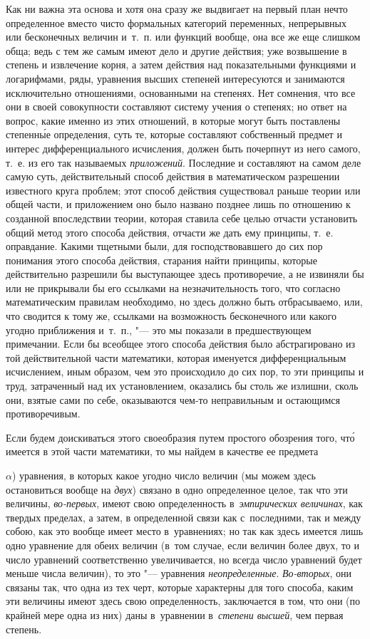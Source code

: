 Как ни важна эта основа и хотя она сразу же выдвигает на первый план нечто
определенное вместо чисто формальных категорий переменных, непрерывных или
бесконечных величин и~т.~п. или функций вообще, она все же еще слишком обща;
ведь с тем же самым имеют дело и другие действия; уже возвышение в степень и
извлечение корня, а затем действия над показательными функциями и логарифмами,
ряды, уравнения высших степеней интересуются и занимаются исключительно
отношениями, основанными на степенях. Нет сомнения, что все они в своей
совокупности составляют систему учения о степенях; но ответ на вопрос, какие
именно из этих отношений, в которые могут быть поставлены степенн\'{ы}е
определения, суть те, которые составляют собственный предмет и интерес
дифференциального исчисления, должен быть почерпнут из него самого, т.~е. из
его так называемых {\em приложений}. Последние и составляют на самом деле самую
суть, действительный способ действия в математическом разрешении известного
круга проблем; этот способ действия существовал раньше теории или общей части,
и приложением оно было названо позднее лишь по отношению к созданной
впоследствии теории, которая ставила себе целью отчасти установить общий метод
этого способа действия, отчасти же дать ему принципы, т.~е. оправдание. Какими
тщетными были, для господствовавшего до сих пор понимания этого способа
действия, старания найти принципы, которые действительно разрешили бы
выступающее здесь противоречие, а не извиняли бы или не прикрывали бы его
ссылками на незначительность того, что согласно математическим правилам
необходимо, но здесь должно быть отбрасываемо, или, что сводится к тому же,
ссылками на возможность бесконечного или какого угодно приближения и~т.~п.,
"--- это мы показали в предшествующем примечании. Если бы всеобщее этого
способа действия было абстрагировано из той действительной части математики,
которая именуется дифференциальным исчислением, иным образом, чем это
происходило до сих пор, то эти принципы и труд, затраченный над их
установлением, оказались бы столь же излишни, сколь они, взятые сами по себе,
оказываются чем-то неправильным и остающимся противоречивым.

Если будем доискиваться этого своеобразия путем простого обозрения того,
чт\'{о} имеется в этой части математики, то мы найдем в качестве ее предмета

$\alpha$) уравнения, в которых какое угодно число величин (мы можем здесь
остановиться вообще на {\em двух}) связано в одно определенное целое, так что
эти величины, {\em во-первых}, имеют свою определенность
в~{\em эмпирических величинах}, как твердых пределах, а затем, в определенной
связи как с~последними, так и между собою, как это вообще имеет место
в~уравнениях; но так как здесь имеется лишь одно уравнение для обеих величин
(в~том случае, если величин более двух, то и число уравнений соответственно
увеличивается, но всегда число уравнений будет меньше числа величин), то это
"--- уравнения {\em неопределенные}. {\em Во-вторых}, они связаны так, что одна
из тех черт, которые характерны для того способа, каким эти величины имеют
здесь свою определенность, заключается в том, что они (по крайней мере одна из
них) даны в~уравнении в~{\em степени высшей}, чем первая степень.

